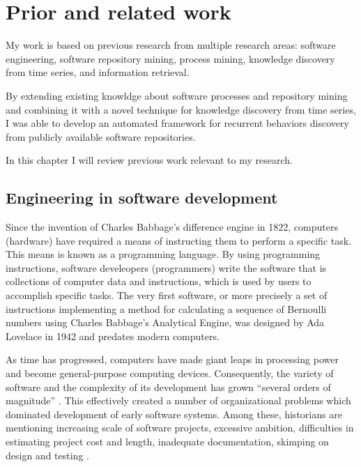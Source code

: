 \chapter{Prior and related work}
My work is based on previous research from multiple research areas: software engineering, 
software repository mining, process mining, knowledge discovery from time series,
and information retrieval. 

By extending existing knowldge about software processes and repository mining and combining 
it with a novel technique for knowledge discovery from time series, 
I was able to develop an automated framework for recurrent behaviors discovery from publicly 
available software repositories.

In this chapter I will review previous work relevant to my research.

\section{Engineering in software development}
Since the invention of Charles Babbage’s difference engine in 1822, computers (hardware) 
have required a means of instructing them to perform a specific task. This means is known 
as a programming language. By using programming instructions, software develeopers (programmers)
write the software that is collections of computer data and instructions, which is used by 
users to accomplish specific tasks. The very first software, or more precisely a set of 
instructions implementing a method for calculating a sequence of Bernoulli numbers using 
Charles Babbage's Analytical Engine, was designed by Ada Lovelace in 1942 and predates modern 
computers. 

As time has progressed, computers have made giant leaps in processing power and become 
general-purpose computing devices. Consequently, the variety of software and 
the complexity of its development has grown ``several orders of magnitude'' \cite{naur_crisis_68}. 
This effectively created a number of organizational problems which dominated development of 
early software systems. Among these, historians are mentioning increasing scale of software projects, 
excessive ambition, difficulties in estimating project cost and length, inadequate documentation, 
skimping on design and testing \cite{mahoney_roots_1990} \cite{citeulike:12748733} 
\cite{citeulike:833903}.

